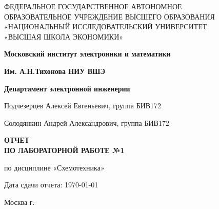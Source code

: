 \begin{titlepage}
	\begin{center}
		ФЕДЕРАЛЬНОЕ  ГОСУДАРСТВЕННОЕ АВТОНОМНОЕ \\
		ОБРАЗОВАТЕЛЬНОЕ УЧРЕЖДЕНИЕ ВЫСШЕГО ОБРАЗОВАНИЯ\\
		«НАЦИОНАЛЬНЫЙ ИССЛЕДОВАТЕЛЬСКИЙ УНИВЕРСИТЕТ\\
		«ВЫСШАЯ ШКОЛА ЭКОНОМИКИ»
	\end{center}
	
	\begin{center}
		\textbf{Московский институт электроники и математики}
		
		\textbf{Им. А.Н.Тихонова НИУ ВШЭ}
		
		\textbf{Департамент электронной инженерии}
	\end{center}
	\vspace{1ex}	
	\begin{center}
		Подчезерцев Алексей Евгеньевич, группа БИВ172
		
		Солодянкин Андрей Александрович, группа БИВ172
	\end{center}	
	\vspace{1ex}
	\begin{center}
		\textbf{ОТЧЕТ\\
		ПО ЛАБОРАТОРНОЙ РАБОТЕ №1
	}
	\end{center}	
	\vspace{2ex}
	\begin{center}
		по дисциплине «Схемотехника»
	\end{center}
	\vspace{2ex}
	\begin{center}
	Дата сдачи отчета: \today
	\end{center}
	\vspace{2ex}
	\vfill
	\begin{center}
		Москва \the\year г.
	\end{center}
\end{titlepage}